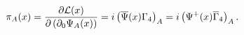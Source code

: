 \begin{equation}
\pi_A (x)=\frac{\partial {\cal L}(x)}{\partial \left(\partial_0
\Psi_A (x)\right)}=i\left(\overline{\Psi }(x)\Gamma_4 \right)_A=
i\left(\Psi^+ (x)\overline{\Gamma}_4 \right)_A  .\label{81}
\end{equation}

